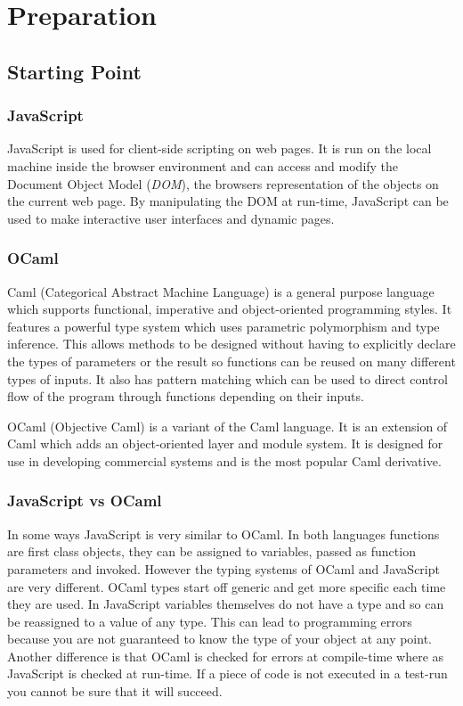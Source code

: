 \chapter{Preparation}

\section{Starting Point}

\subsection{JavaScript}
JavaScript is used for client-side scripting on web pages. It is run on the local machine inside the browser environment and can access and modify the Document Object Model (\emph{DOM}), the browsers representation of the  objects on the current web page. By manipulating the DOM at run-time, JavaScript can be used to make interactive user interfaces and dynamic pages.

\subsection{OCaml}
Caml (Categorical Abstract Machine Language) is a general purpose language which supports functional, imperative and object-oriented programming styles. It features a powerful type system which uses parametric polymorphism and type inference. This allows methods to be designed without having to explicitly declare the types of parameters or the result so functions can be reused on many different types of inputs. It also has pattern matching which can be used to direct control flow of the program through functions depending on their inputs.\cite{bib:caml}

OCaml (Objective Caml) is a variant of the Caml language. It is an extension of Caml which adds an object-oriented layer and module system. It is designed for use in developing commercial systems and is the most popular Caml derivative.\cite{bib:ocaml}

\subsection{JavaScript vs OCaml}
In some ways JavaScript is very similar to OCaml. In both languages functions are first class objects, they can be assigned to variables, passed as function parameters and invoked. However the typing systems of OCaml and JavaScript are very different. OCaml types start off generic and get more specific each time they are used. In JavaScript variables themselves do not have a type and so can be reassigned to a value of any type. This can lead to programming errors because you are not guaranteed to know the type of your object at any point. Another difference is that OCaml is checked for errors at compile-time where as JavaScript is checked at run-time. If a piece of code is not executed in a test-run you cannot be sure that it will succeed.

